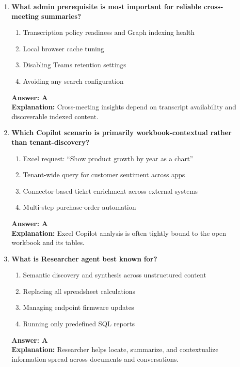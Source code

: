 \documentclass[10pt]{article}
\begin{document}
\begin{enumerate}[leftmargin=*]
\item \textbf{What admin prerequisite is most important for reliable cross-meeting summaries?}
\begin{enumerate}[label=\Alph*.]
  \item Transcription policy readiness and Graph indexing health
  \item Local browser cache tuning
  \item Disabling Teams retention settings
  \item Avoiding any search configuration
\end{enumerate}
\textbf{Answer: A}\\
\textbf{Explanation:} Cross-meeting insights depend on transcript availability and discoverable indexed content.

\item \textbf{Which Copilot scenario is primarily workbook-contextual rather than tenant-discovery?}
\begin{enumerate}[label=\Alph*.]
  \item Excel request: ``Show product growth by year as a chart''
  \item Tenant-wide query for customer sentiment across apps
  \item Connector-based ticket enrichment across external systems
  \item Multi-step purchase-order automation
\end{enumerate}
\textbf{Answer: A}\\
\textbf{Explanation:} Excel Copilot analysis is often tightly bound to the open workbook and its tables.

\item \textbf{What is Researcher agent best known for?}
\begin{enumerate}[label=\Alph*.]
  \item Semantic discovery and synthesis across unstructured content
  \item Replacing all spreadsheet calculations
  \item Managing endpoint firmware updates
  \item Running only predefined SQL reports
\end{enumerate}
\textbf{Answer: A}\\
\textbf{Explanation:} Researcher helps locate, summarize, and contextualize information spread across documents and conversations.


\end{enumerate}
\end{document}
